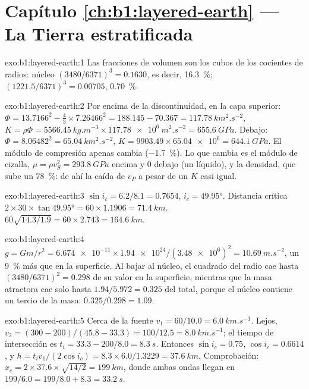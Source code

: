 \section*{Capítulo \ref{ch:b1:layered-earth} --- La Tierra estratificada}

\begin{solution}{exo:b1:layered-earth:1}
Las fracciones de volumen son los cubos de los cocientes de radios: núcleo $(3480/6371)^3 = 0.1630$, es decir, \qty{16.3}{\percent};
 $(1221.5/6371)^3 = 0.00705$, \qty{0.70}{\percent}.
\end{solution}

\begin{solution}{exo:b1:layered-earth:2}
Por encima de la discontinuidad, en la capa superior: $\Phi = 13.7166^2 - \tfrac43\times7.26466^2 = 188.145 - 70.367 =
\qty{117.78}{km^2.s^{-2}}$, $K = \rho\Phi = \qty{5566.45}{kg.m^{-3}}\times
\qty{117.78e6}{m^2.s^{-2}} = \qty{655.6}{GPa}$. Debajo: $\Phi = 8.06482^2 =
\qty{65.04}{km^2.s^{-2}}$, $K = 9903.49\times\num{65.04e6} = \qty{644.1}{GPa}$.
El módulo de compresión apenas cambia (\qty{-1.7}{\percent}). Lo que cambia es el módulo de cizalla,
$\mu = \rho v_S^2 = \qty{293.8}{GPa}$ encima y $0$ debajo (un líquido), y la densidad, que sube un \qty{78}{\percent}:
de ahí la caída de $v_P$ a pesar de un $K$ casi igual.
\end{solution}

\begin{solution}{exo:b1:layered-earth:3}
$\sin i_c = 6.2/8.1 = 0.7654$, $i_c = \ang{49.95}$. Distancia crítica
$2\times30\times\tan\ang{49.95} = 60\times1.1906 = \qty{71.4}{km}$. 
$60\sqrt{14.3/1.9} = 60\times2.743 = \qty{164.6}{km}$.
\end{solution}

\begin{solution}{exo:b1:layered-earth:4}
$g = Gm/r^2 = \num{6.674e-11}\times\num{1.94e24}/(\num{3.48e6})^2 =
\qty{10.69}{m.s^{-2}}$, un \qty{9}{\percent} más que en la superficie. Al bajar al núcleo, el cuadrado del radio cae
hasta $(3480/6371)^2 = 0.298$ de su valor en la superficie, mientras que la masa atractora cae solo hasta
$1.94/5.972 = 0.325$ del total, porque el núcleo contiene un tercio de la masa: $0.325/0.298 = 1.09$.
\end{solution}

\begin{solution}{exo:b1:layered-earth:5}
Cerca de la fuente $v_1 = 60/10.0 = \qty{6.0}{km.s^{-1}}$. Lejos, $v_2 = (300 - 200)/(45.8 - 33.3) = 100/12.5 = \qty{8.0}{km.s^{-1}}$; el tiempo de intersección es $t_i = 33.3 - 200/8.0 = \qty{8.3}{s}$. Entonces $\sin i_c =
0.75$, $\cos i_c = 0.6614$, y $h = t_i v_1/(2\cos i_c) = 8.3\times6.0/1.3229
= \qty{37.6}{km}$. Comprobación: $x_c = 2\times37.6\times\sqrt{14/2} = \qty{199}{km}$, donde ambas ondas llegan en
$199/6.0 = 199/8.0 + 8.3 = \qty{33.2}{s}$.
\end{solution}

